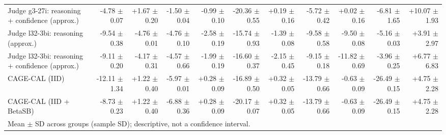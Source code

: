 \begin{tabular}{lrrrrrrrrrr}
Judge g3-27i: reasoning + confidence (approx.) & -4.78 {\scriptsize $\pm$ 0.07} & +1.67 {\scriptsize $\pm$ 0.20} & -1.50 {\scriptsize $\pm$ 0.04} & -0.99 {\scriptsize $\pm$ 0.10} & -20.36 {\scriptsize $\pm$ 0.55} & +0.19 {\scriptsize $\pm$ 0.16} & -5.72 {\scriptsize $\pm$ 0.42} & +0.02 {\scriptsize $\pm$ 0.16} & -6.81 {\scriptsize $\pm$ 1.65} & +10.07 {\scriptsize $\pm$ 1.93} \\
Judge l32-3bi: reasoning (approx.) & -9.54 {\scriptsize $\pm$ 0.38} & -4.76 {\scriptsize $\pm$ 0.01} & -4.76 {\scriptsize $\pm$ 0.10} & -2.58 {\scriptsize $\pm$ 0.19} & -15.74 {\scriptsize $\pm$ 0.93} & -1.39 {\scriptsize $\pm$ 0.08} & -9.58 {\scriptsize $\pm$ 0.58} & -9.50 {\scriptsize $\pm$ 0.08} & -5.16 {\scriptsize $\pm$ 0.03} & +3.91 {\scriptsize $\pm$ 2.97} \\
Judge l32-3bi: reasoning + confidence (approx.) & -9.11 {\scriptsize $\pm$ 0.20} & -4.17 {\scriptsize $\pm$ 0.31} & -4.57 {\scriptsize $\pm$ 0.66} & -1.99 {\scriptsize $\pm$ 0.19} & -16.60 {\scriptsize $\pm$ 0.37} & -2.15 {\scriptsize $\pm$ 0.45} & -9.15 {\scriptsize $\pm$ 0.18} & -11.82 {\scriptsize $\pm$ 0.69} & -3.96 {\scriptsize $\pm$ 0.25} & +6.77 {\scriptsize $\pm$ 6.83} \\
CAGE-CAL (IID) & -12.11 {\scriptsize $\pm$ 1.34} & +1.22 {\scriptsize $\pm$ 0.40} & -5.97 {\scriptsize $\pm$ 0.01} & +0.28 {\scriptsize $\pm$ 0.09} & -16.89 {\scriptsize $\pm$ 0.50} & +0.32 {\scriptsize $\pm$ 0.05} & -13.79 {\scriptsize $\pm$ 0.66} & -0.63 {\scriptsize $\pm$ 0.09} & -26.49 {\scriptsize $\pm$ 0.15} & +4.75 {\scriptsize $\pm$ 2.28} \\
CAGE-CAL (IID + BetaSB) & -8.73 {\scriptsize $\pm$ 0.23} & +1.22 {\scriptsize $\pm$ 0.40} & -6.88 {\scriptsize $\pm$ 0.36} & +0.28 {\scriptsize $\pm$ 0.09} & -20.17 {\scriptsize $\pm$ 0.07} & +0.32 {\scriptsize $\pm$ 0.05} & -13.79 {\scriptsize $\pm$ 0.66} & -0.63 {\scriptsize $\pm$ 0.09} & -26.49 {\scriptsize $\pm$ 0.15} & +4.75 {\scriptsize $\pm$ 2.28} \\
\bottomrule
\multicolumn{11}{l}{\scriptsize Mean $\pm$ SD across groups (sample SD); descriptive, not a confidence interval.} \\
\end{tabular}
